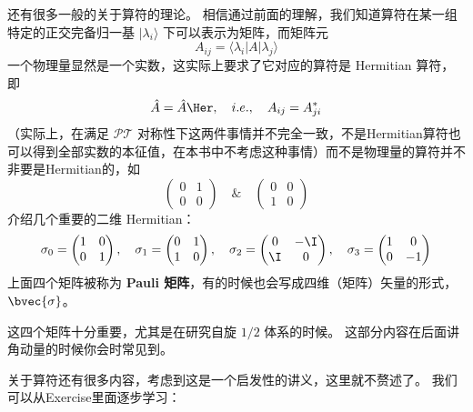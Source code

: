 还有很多一般的关于算符的理论。 相信通过前面的理解，我们知道算符在某一组特定的正交完备归一基 $|\lambda_i\rangle$ 下可以表示为矩阵，而矩阵元
\begin{equation}
A_{ij} = \langle\lambda_i|A|\lambda_j\rangle
\end{equation}
一个物理量显然是一个实数，这实际上要求了它对应的算符是 Hermitian 算符，即
\begin{equation}
\hat{A} = \hat{A}\Her,\quad i.e.,\quad A_{ij} = A_{ji}^*
\end{equation}
（实际上，在满足 $\mathcal{PT}$ 对称性下这两件事情并不完全一致，不是Hermitian算符也可以得到全部实数的本征值，在本书中不考虑这种事情）而不是物理量的算符并不非要是Hermitian的，如
\begin{equation}
\left(\begin{matrix}0 & 1\\0 & 0\end{matrix}\right) \quad \& \quad \left(\begin{matrix}0 & 0\\1 & 0\end{matrix}\right)
\end{equation}
介绍几个重要的二维 Hermitian：
\begin{equation}\label{Basics_eq18}
\sigma_0 = \left(\begin{matrix}1 & 0\\0 & 1\end{matrix}\right),
\quad\sigma_1 = \left(\begin{matrix} 0 & 1\\1 & 0\end{matrix}\right),
\quad\sigma_2 = \left(\begin{matrix} 0 & -\I\\ \I & 0\end{matrix}\right),
\quad\sigma_3 = \left(\begin{matrix} 1 & 0\\0 & -1\end{matrix}\right)  
\end{equation}
上面四个矩阵被称为 \textbf{Pauli 矩阵}，有的时候也会写成四维（矩阵）矢量的形式，$\bvec{\sigma}$。

这四个矩阵十分重要，尤其是在研究自旋 $1/2$ 体系的时候。 这部分内容在后面讲角动量的时候你会时常见到。

关于算符还有很多内容，考虑到这是一个启发性的讲义，这里就不赘述了。 我们可以从Exercise里面逐步学习：

